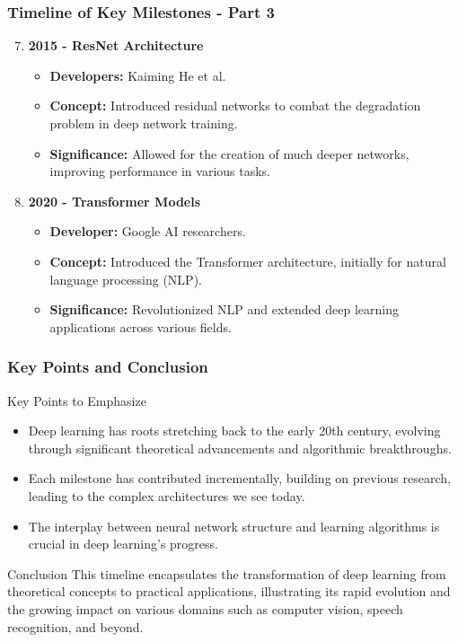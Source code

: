 \documentclass[aspectratio=169]{beamer}
\begin{document}
\begin{frame}[fragile]
    \frametitle{Timeline of Key Milestones - Part 3}
    \begin{enumerate}
        \setcounter{enumi}{6} %
        
        \item \textbf{2015 - ResNet Architecture}
        \begin{itemize}
            \item \textbf{Developers:} Kaiming He et al.
            \item \textbf{Concept:} Introduced residual networks to combat the degradation problem in deep network training.
            \item \textbf{Significance:} Allowed for the creation of much deeper networks, improving performance in various tasks.
        \end{itemize}

        \item \textbf{2020 - Transformer Models}
        \begin{itemize}
            \item \textbf{Developer:} Google AI researchers.
            \item \textbf{Concept:} Introduced the Transformer architecture, initially for natural language processing (NLP).
            \item \textbf{Significance:} Revolutionized NLP and extended deep learning applications across various fields.
        \end{itemize}
    \end{enumerate}
\end{frame}

\begin{frame}[fragile]
    \frametitle{Key Points and Conclusion}
    \begin{block}{Key Points to Emphasize}
        \begin{itemize}
            \item Deep learning has roots stretching back to the early 20th century, evolving through significant theoretical advancements and algorithmic breakthroughs.
            \item Each milestone has contributed incrementally, building on previous research, leading to the complex architectures we see today.
            \item The interplay between neural network structure and learning algorithms is crucial in deep learning's progress.
        \end{itemize}
    \end{block}

    \begin{block}{Conclusion}
        This timeline encapsulates the transformation of deep learning from theoretical concepts to practical applications, illustrating its rapid evolution and the growing impact on various domains such as computer vision, speech recognition, and beyond.
    \end{block}
\end{frame}
\end{document}
